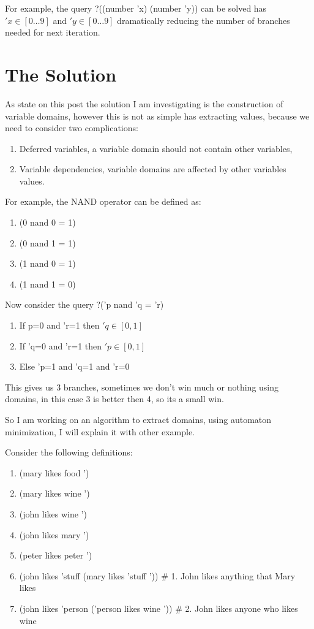 \documentclass{article}
\begin{document}
For example, the query ?((number 'x) (number 'y)) can be solved has $'x \in [0 \ldots 9]$ and $'y \in [0 \ldots 9]$
dramatically reducing the number of branches needed for next iteration.

\section{The Solution}

As state on this post the solution I am investigating is the construction of variable domains, however 
this is not as simple has extracting values, because we need to consider two complications:

\begin{enumerate}
\item Deferred variables, a variable domain should not contain other variables,
\item Variable dependencies, variable domains are affected by other variables values.
\end{enumerate}

For example, the NAND operator can be defined as:

\begin{enumerate}
\item (0 nand 0 = 1)
\item (0 nand 1 = 1)
\item (1 nand 0 = 1)
\item (1 nand 1 = 0)
\end{enumerate}

Now consider the query ?('p nand 'q = 'r)

\begin{enumerate}
\item If  p=0 and 'r=1 then $'q \in [0, 1]$
\item If 'q=0 and 'r=1 then $'p \in [0, 1]$
\item Else 'p=1 and 'q=1 and 'r=0
\end{enumerate}

This gives us 3 branches, sometimes we don't win much or nothing using domains, in this case 3 is better then 4, so its a small win.

So I am working on an algorithm to extract domains, using automaton minimization, I will explain it with other 
example.

Consider the following definitions:
\begin{enumerate}
\item (mary likes food ')
\item (mary likes wine ')
\item (john likes wine ')
\item (john likes mary ')
\item (peter likes peter ')
\item (john likes 'stuff (mary likes 'stuff ')) # 1. John likes anything that Mary likes
\item (john likes 'person ('person likes wine ')) # 2. John likes anyone who likes wine
\end{enumerate}
\end{document}
